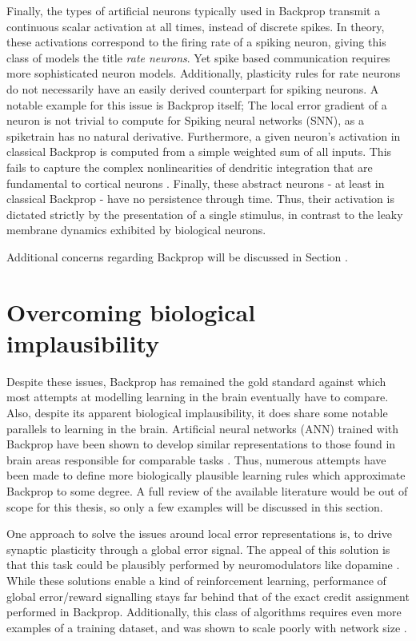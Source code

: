 Finally, the types of artificial neurons typically used in Backprop transmit a continuous scalar activation at all
times, instead of discrete spikes. In theory, these activations correspond to the firing rate of a spiking neuron,
giving this class of models the title \textit{rate neurons}. Yet spike based communication requires more sophisticated
neuron models. Additionally, plasticity rules for rate neurons do not necessarily have an easily derived counterpart for
spiking neurons. A notable example for this issue is Backprop itself; The local error gradient of a neuron is not
trivial to compute for Spiking neural networks (SNN), as a spiketrain has no natural derivative. Furthermore, a given
neuron's activation in classical Backprop is computed from a simple weighted sum of all inputs. This fails to capture
the complex nonlinearities of dendritic integration that are fundamental to cortical neurons
\citep{Gerstner2009,sjostrom2008dendritic,Eyal2018}. Finally, these abstract neurons - at least in classical Backprop -
have no persistence through time. Thus, their activation is dictated strictly by the presentation of a single stimulus,
in contrast to the leaky membrane dynamics exhibited by biological neurons.\newline

Additional concerns regarding Backprop will be discussed in Section \todo{}.


\section{Overcoming biological implausibility}

Despite these issues, Backprop has remained the gold standard against which most attempts at modelling learning in the
brain eventually have to compare. Also, despite its apparent biological implausibility, it does share some notable
parallels to learning in the brain. Artificial neural networks (ANN) trained with Backprop have been shown to develop
similar representations to those found in brain areas responsible for comparable tasks
\citep{Yamins2016,Whittington2018,KhalighRazavi2014,Kubilius2016}. Thus, numerous attempts have been made to define more
biologically plausible learning rules which approximate Backprop to some degree. A full review of the available
literature would be out of scope for this thesis, so only a few examples will be discussed in this section.

One approach to solve the issues around local error representations is, to drive synaptic plasticity through a global
error signal. The appeal of this solution is that this task could be plausibly performed by neuromodulators like
dopamine \citep{Mazzoni1991,Seung2003,izhikevich2007solving}. While these solutions enable a kind of reinforcement
learning, performance of global error/reward signalling stays far behind that of the exact credit assignment performed
in Backprop. Additionally, this class of algorithms requires even more examples of a training dataset, and was shown to
scale poorly with network size \citep{Werfel2003}.


